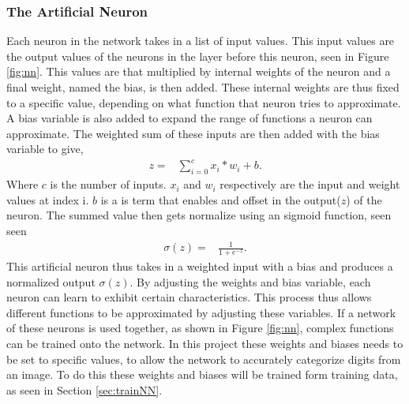 \subsubsection{The Artificial Neuron}
Each neuron in the network takes in a list of input values. This input values are the output values of the neurons in the layer before this neuron, seen in Figure \ref{fig:nn}. This values are that multiplied by internal weights of the neuron and a final weight, named the bias, is then added. These internal weights are thus fixed to a specific value, depending on what function that neuron tries to approximate. A bias variable is also added to expand the range of functions a neuron can approximate. The weighted sum of these inputs are then added with the bias variable to give,
\begin{align}
  z =  &\displaystyle{\sum_{i=0}^{c} x_{i}*w_{i} + b}.
\label{eqn:nnOut}
\end{align}
Where $c$ is the number of inputs. $x_{i}$ and $w_{i}$ respectively are the input and weight values at index i. $b$ is a is term that enables and offset in the output($z$) of the neuron.
The summed value then gets normalize using an sigmoid function, seen seen
\begin{align}
  \sigma(z) =  &\displaystyle{\frac{1}{1 + e^{-z}}}.
\label{eqn:sigmoid}
\end{align}
This artificial neuron thus takes in a weighted input with a bias and produces a normalized output $\sigma(z)$. By adjusting the weights and bias variable, each neuron can learn to exhibit certain characteristics. This process thus allows different functions to be approximated by adjusting these variables. If a network of these neurons is used together, as shown in Figure \ref{fig:nn}, complex functions can be trained onto the network. In this project these weights and biases needs to be set to specific values, to allow the network to accurately categorize digits from an image. To do this these weights and biases will be trained form training data, as seen in Section \ref{sec:trainNN}.


